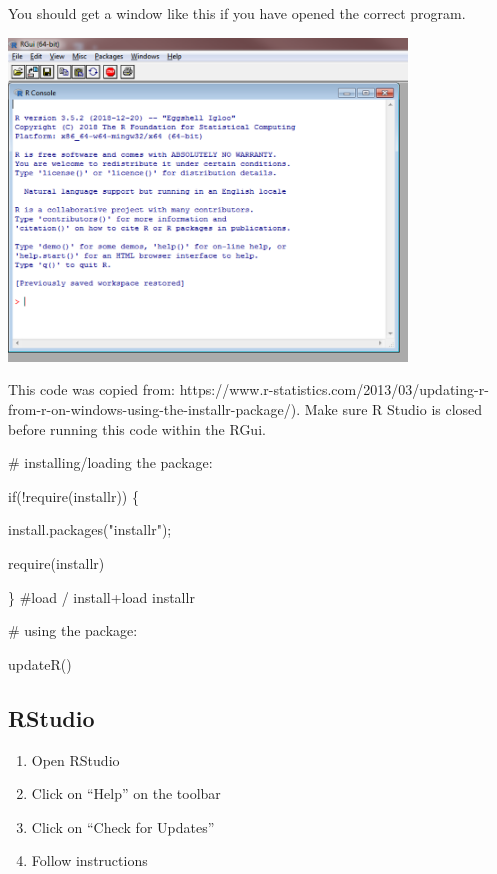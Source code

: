 \documentclass[
  letterpaper,
  DIV=11,
  numbers=noendperiod]{scrreprt}
\newenvironment{Shaded}{\begin{snugshade}}{\end{snugshade}}
\newcommand{\CommentTok}[1]{\textcolor[rgb]{0.37,0.37,0.37}{#1}}
\newcommand{\ControlFlowTok}[1]{\textcolor[rgb]{0.00,0.23,0.31}{#1}}
\newcommand{\FunctionTok}[1]{\textcolor[rgb]{0.28,0.35,0.67}{#1}}
\newcommand{\NormalTok}[1]{\textcolor[rgb]{0.00,0.23,0.31}{#1}}
\newcommand{\SpecialCharTok}[1]{\textcolor[rgb]{0.37,0.37,0.37}{#1}}
\newcommand{\StringTok}[1]{\textcolor[rgb]{0.13,0.47,0.30}{#1}}
\begin{document}
You should get a window like this if you have opened the correct
program.

\includegraphics[width=4.16667in,height=\textheight]{images/installation_updates/rgui.png}

This code was copied from:
https://www.r-statistics.com/2013/03/updating-r-from-r-on-windows-using-the-installr-package/).
Make sure R Studio is closed before running this code within the RGui.

\begin{Shaded}
\begin{Highlighting}[]
\CommentTok{\# installing/loading the package:}

\ControlFlowTok{if}\NormalTok{(}\SpecialCharTok{!}\FunctionTok{require}\NormalTok{(installr)) \{}

\FunctionTok{install.packages}\NormalTok{(}\StringTok{"installr"}\NormalTok{);}

\FunctionTok{require}\NormalTok{(installr)}

\NormalTok{\} }\CommentTok{\#load / install+load installr}

\CommentTok{\# using the package:}

\FunctionTok{updateR}\NormalTok{()}
\end{Highlighting}
\end{Shaded}

\hypertarget{rstudio}{%
\subsection{RStudio}\label{rstudio}}

\begin{enumerate}
\def\labelenumi{\arabic{enumi}.}
\item
  Open RStudio
\item
  Click on ``Help'' on the toolbar
\item
  Click on ``Check for Updates''
\item
  Follow instructions
\end{enumerate}
\end{document}
